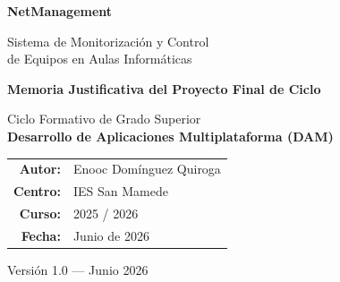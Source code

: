 \documentclass[12pt, a4paper, twoside]{article}
\begin{document}
\begin{titlepage}
  \centering
  \vspace*{2cm}

  {\Huge\bfseries\color{primary} NetManagement\par}
  \vspace{0.5cm}
  {\LARGE Sistema de Monitorización y Control\\de Equipos en Aulas Informáticas\par}

  \vspace{2cm}


  \vspace{2cm}

  {\Large\bfseries Memoria Justificativa del Proyecto Final de Ciclo\par}
  \vspace{0.5cm}
  {\large Ciclo Formativo de Grado Superior\\
  \textbf{Desarrollo de Aplicaciones Multiplataforma (DAM)}\par}

  \vspace{2cm}

  \begin{tabular}{rl}
    \textbf{Autor:}  & Enooc Domínguez Quiroga \\[0.3cm]
    \textbf{Centro:} & IES San Mamede \\[0.3cm]
    \textbf{Curso:}  & 2025 / 2026 \\[0.3cm]
    \textbf{Fecha:}  & Junio de 2026 \\
  \end{tabular}

  \vfill

  {\small Versión 1.0 — Junio 2026\par}
\end{titlepage}

\newpage
\thispagestyle{empty}
\end{document}
